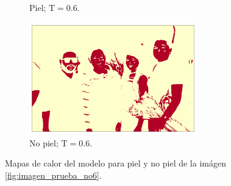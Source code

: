 \begin{figure}[ht!]
\begin{subfigure}{0.4\textwidth}
        \caption{Piel; $\text{T} = 0.6$.}
    \end{subfigure}
    \hspace{1cm}
    \begin{subfigure}{0.4\textwidth}
        \centering
        \includegraphics[width=0.8\textwidth]{../figures/image6/image_06_treshbg_60percent.png}
        \caption{No piel; $\text{T} = 0.6$.}
    \end{subfigure}
    \caption{Mapas de calor del modelo para piel y no piel de la imágen \cref{fig:imagen_prueba_no6}.}
    \label{fig:model_applied_no6}
\end{figure}

